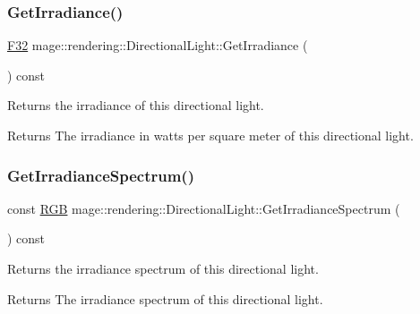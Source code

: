 \subsubsection{\texorpdfstring{Get\+Irradiance()}{GetIrradiance()}}
{\footnotesize\ttfamily \mbox{\hyperlink{namespacemage_aa97e833b45f06d60a0a9c4fc22ae02c0}{F32}} mage\+::rendering\+::\+Directional\+Light\+::\+Get\+Irradiance (\begin{DoxyParamCaption}{ }\end{DoxyParamCaption}) const\hspace{0.3cm}{\ttfamily [noexcept]}}

Returns the irradiance of this directional light.

\begin{DoxyReturn}{Returns}
The irradiance in watts per square meter of this directional light. 
\end{DoxyReturn}
\mbox{\label{classmage_1_1rendering_1_1_directional_light_a3a99d3d63a686f8bc587015115a85a81}} 
\subsubsection{\texorpdfstring{Get\+Irradiance\+Spectrum()}{GetIrradianceSpectrum()}}
{\footnotesize\ttfamily const \mbox{\hyperlink{structmage_1_1_r_g_b}{R\+GB}} mage\+::rendering\+::\+Directional\+Light\+::\+Get\+Irradiance\+Spectrum (\begin{DoxyParamCaption}{ }\end{DoxyParamCaption}) const\hspace{0.3cm}{\ttfamily [noexcept]}}

Returns the irradiance spectrum of this directional light.

\begin{DoxyReturn}{Returns}
The irradiance spectrum of this directional light. 
\end{DoxyReturn}
\mbox{\label{classmage_1_1rendering_1_1_directional_light_aa81fa39a4d068d879a6d90587ee324d8}} 
